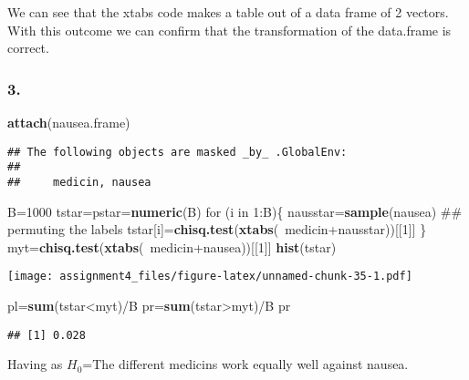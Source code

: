 \documentclass[11pt,]{article}
\newenvironment{Shaded}{\begin{snugshade}}{\end{snugshade}}
\newcommand{\KeywordTok}[1]{\textcolor[rgb]{0.13,0.29,0.53}{\textbf{{#1}}}}
\newcommand{\DecValTok}[1]{\textcolor[rgb]{0.00,0.00,0.81}{{#1}}}
\newcommand{\NormalTok}[1]{{#1}}
\begin{document}
We can see that the xtabs code makes a table out of a data frame of 2
vectors. With this outcome we can confirm that the transformation of the
data.frame is correct.

\subsubsection{3.}\label{section-22}

\begin{Shaded}
\begin{Highlighting}[]
\KeywordTok{attach}\NormalTok{(nausea.frame)}
\end{Highlighting}
\end{Shaded}

\begin{verbatim}
## The following objects are masked _by_ .GlobalEnv:
## 
##     medicin, nausea
\end{verbatim}

\begin{Shaded}
\begin{Highlighting}[]
\NormalTok{B=}\DecValTok{1000}
\NormalTok{tstar=pstar=}\KeywordTok{numeric}\NormalTok{(B)}
\NormalTok{for (i in }\DecValTok{1}\NormalTok{:B)\{}
    \NormalTok{nausstar=}\KeywordTok{sample}\NormalTok{(nausea) ## permuting the labels}
    \NormalTok{tstar[i]=}\KeywordTok{chisq.test}\NormalTok{(}\KeywordTok{xtabs}\NormalTok{(~medicin+nausstar))[[}\DecValTok{1}\NormalTok{]]}
\NormalTok{\}}
\NormalTok{myt=}\KeywordTok{chisq.test}\NormalTok{(}\KeywordTok{xtabs}\NormalTok{(~medicin+nausea))[[}\DecValTok{1}\NormalTok{]]}
\KeywordTok{hist}\NormalTok{(tstar)}
\end{Highlighting}
\end{Shaded}

\texttt{[image: assignment4\_files/figure-latex/unnamed-chunk-35-1.pdf]}

\begin{Shaded}
\begin{Highlighting}[]
\NormalTok{pl=}\KeywordTok{sum}\NormalTok{(tstar<myt)/B}
\NormalTok{pr=}\KeywordTok{sum}\NormalTok{(tstar>myt)/B}
\NormalTok{pr}
\end{Highlighting}
\end{Shaded}

\begin{verbatim}
## [1] 0.028
\end{verbatim}

Having as \(H_0\)=The different medicins work equally well against
nausea.
\end{document}
